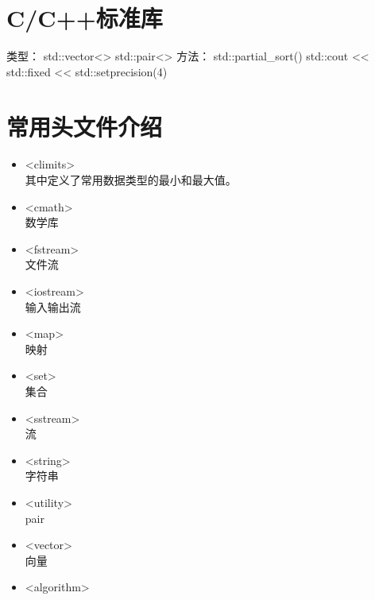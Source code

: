 \section{C/C++标准库}
类型：
std::vector<>
std::pair<>
方法：
std::partial\_sort()
std::cout << std::fixed << std::setprecision(4)

\section{常用头文件介绍}
\begin{itemize}
\item <climits> \\
  其中定义了常用数据类型的最小和最大值。
\item <cmath> \\
  数学库
\item <fstream> \\
  文件流
\item <iostream> \\
  输入输出流
\item <map> \\
  映射
\item <set> \\
  集合
\item <sstream> \\
  流
\item <string> \\
  字符串
\item <utility> \\
  pair
\item <vector> \\
  向量
\item <algorithm> \\
  
\end{itemize}
